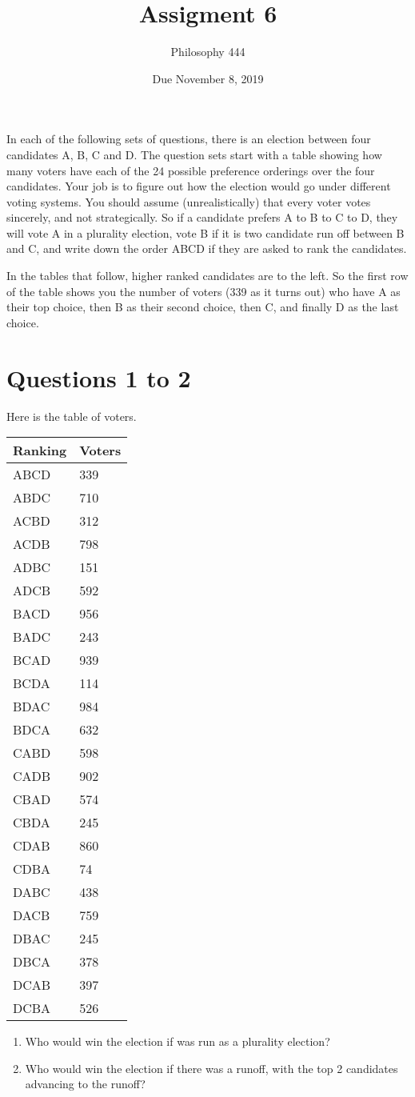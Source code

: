 \documentclass[11pt,]{article}
\title{Assigment 6}
\author{Philosophy 444}
\date{Due November 8, 2019}
\providecommand{\tightlist}{%
  \setlength{\itemsep}{0pt}\setlength{\parskip}{0pt}}
\begin{document}
\maketitle

In each of the following sets of questions, there is an election between
four candidates A, B, C and D. The question sets start with a table
showing how many voters have each of the 24 possible preference
orderings over the four candidates. Your job is to figure out how the
election would go under different voting systems. You should assume
(unrealistically) that every voter votes sincerely, and not
strategically. So if a candidate prefers A to B to C to D, they will
vote A in a plurality election, vote B if it is two candidate run off
between B and C, and write down the order ABCD if they are asked to rank
the candidates.

In the tables that follow, higher ranked candidates are to the left. So
the first row of the table shows you the number of voters (339 as it
turns out) who have A as their top choice, then B as their second
choice, then C, and finally D as the last choice.

\newpage

\hypertarget{questions-1-to-2}{%
\section{Questions 1 to 2}\label{questions-1-to-2}}

Here is the table of voters.

\begin{longtable}[]{@{}ll@{}}
\toprule
Ranking & Voters\tabularnewline
\midrule
\endhead
ABCD & 339\tabularnewline
ABDC & 710\tabularnewline
ACBD & 312\tabularnewline
ACDB & 798\tabularnewline
ADBC & 151\tabularnewline
ADCB & 592\tabularnewline
BACD & 956\tabularnewline
BADC & 243\tabularnewline
BCAD & 939\tabularnewline
BCDA & 114\tabularnewline
BDAC & 984\tabularnewline
BDCA & 632\tabularnewline
CABD & 598\tabularnewline
CADB & 902\tabularnewline
CBAD & 574\tabularnewline
CBDA & 245\tabularnewline
CDAB & 860\tabularnewline
CDBA & 74\tabularnewline
DABC & 438\tabularnewline
DACB & 759\tabularnewline
DBAC & 245\tabularnewline
DBCA & 378\tabularnewline
DCAB & 397\tabularnewline
DCBA & 526\tabularnewline
\bottomrule
\end{longtable}

\begin{enumerate}
\def\labelenumi{\arabic{enumi}.}
\tightlist
\item
  Who would win the election if was run as a plurality election?
\item
  Who would win the election if there was a runoff, with the top 2
  candidates advancing to the runoff?
\end{enumerate}
\end{document}
